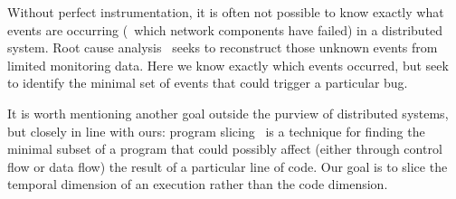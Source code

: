 
\vspace{0.05in}
 Without perfect instrumentation,
it is often not possible to know exactly what events are occurring (\eg~which
network components have failed) in a
distributed system. Root cause analysis~\cite{yemini1996,Kandula:2009:DDE:1592568.1592597}
seeks to reconstruct those unknown events from limited monitoring data.
Here we know exactly which events occurred, but
seek to identify the minimal set of events that could trigger a particular bug.

\vspace{0.05in}
It is worth mentioning another goal outside the purview of distributed systems, but
closely in line with ours: program slicing~\cite{weiser1981program} is a
technique for finding the
minimal subset of a program that could possibly affect (either through control flow or data
flow) the result of a particular line of code.
Our goal is to slice the temporal dimension of an execution rather than the
code dimension.

